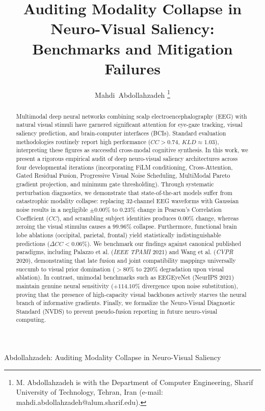 \documentclass[journal,twocolumn]{IEEEtran}
\begin{document}
\title{Auditing Modality Collapse in Neuro-Visual Saliency: Benchmarks and Mitigation Failures}

\author{Mahdi~Abdollahzadeh%
\thanks{M. Abdollahzadeh is with the Department of Computer Engineering, Sharif University of Technology, Tehran, Iran (e-mail: mahdi.abdollahzadeh@alum.sharif.edu).}}

%
{Abdollahzadeh: Auditing Modality Collapse in Neuro-Visual Saliency}

\maketitle

\begin{abstract}
Multimodal deep neural networks combining scalp electroencephalography (EEG) with natural visual stimuli have garnered significant attention for eye-gaze tracking, visual saliency prediction, and brain-computer interfaces (BCIs). Standard evaluation methodologies routinely report high performance ($CC > 0.74$, $KLD \approx 1.03$), interpreting these figures as successful cross-modal cognitive synthesis. In this work, we present a rigorous empirical audit of deep neuro-visual saliency architectures across four developmental iterations (incorporating FiLM conditioning, Cross-Attention, Gated Residual Fusion, Progressive Visual Noise Scheduling, MultiModal Pareto gradient projection, and minimum gate thresholding). Through systematic perturbation diagnostics, we demonstrate that state-of-the-art models suffer from catastrophic modality collapse: replacing 32-channel EEG waveforms with Gaussian noise results in a negligible $\pm 0.00\%$ to $0.23\%$ change in Pearson's Correlation Coefficient ($CC$), and scrambling subject identities produces $0.00\%$ change, whereas zeroing the visual stimulus causes a $99.96\%$ collapse. Furthermore, functional brain lobe ablations (occipital, parietal, frontal) yield statistically indistinguishable predictions ($\Delta CC < 0.06\%$). We benchmark our findings against canonical published paradigms, including Palazzo et al. (\textit{IEEE TPAMI} 2021) and Wang et al. (\textit{CVPR} 2020), demonstrating that late fusion and joint compatibility mappings universally succumb to visual prior domination ($>80\%$ to $220\%$ degradation upon visual ablation). In contrast, unimodal benchmarks such as EEGEyeNet (NeurIPS 2021) maintain genuine neural sensitivity ($+114.10\%$ divergence upon noise substitution), proving that the presence of high-capacity visual backbones actively starves the neural branch of informative gradients. Finally, we formalize the Neuro-Visual Diagnostic Standard (NVDS) to prevent pseudo-fusion reporting in future neuro-visual computing.
\end{abstract}
\end{document}
